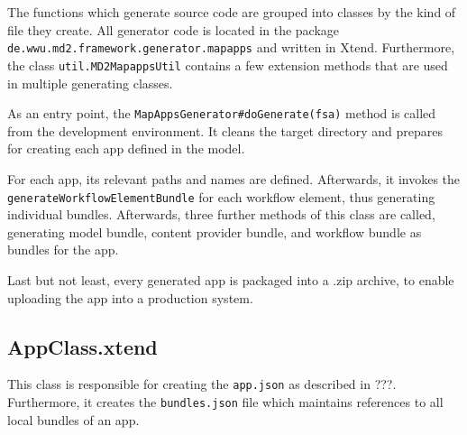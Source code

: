 
The functions which generate \mapapps source code are grouped into classes by the kind of file they create. All \mapapps generator code is located in the package \lstinline[language=Simple]|de.wwu.md2.framework.generator.mapapps| and written in Xtend. Furthermore, the class \lstinline|util.MD2MapappsUtil| contains a few extension methods that are used in multiple generating classes.

As an entry point, the \lstinline[language=Simple]|MapAppsGenerator#doGenerate(fsa)| method is called from the development environment. It cleans the target directory and prepares for creating  each app defined in the model.

For each app, its relevant paths and names are defined. Afterwards, it invokes the \lstinline|generateWorkflowElementBundle| for each workflow element, thus generating individual bundles. Afterwards, three further methods of this class are called, generating model bundle, content provider bundle, and workflow bundle as bundles for the app.


Last but not least, every generated app is packaged into a .zip archive, to enable uploading the app into a production \mapapps system.

\subsection{AppClass.xtend}

This class is responsible for creating the \lstinline[language=Simple]|app.json| as described in ???. Furthermore, it creates the \lstinline[language=Simple]|bundles.json| file which maintains references to all local bundles of an app.